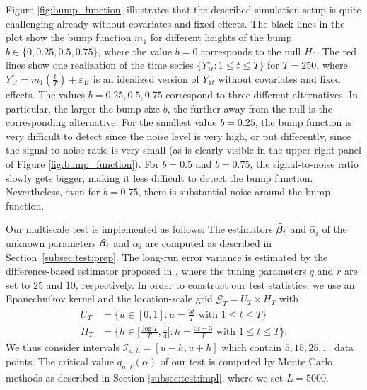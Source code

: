 \documentclass[12pt]{article}
\begin{document}
Figure \ref{fig:bump_function} illustrates that the described simulation setup is quite challenging already without covariates and fixed effects. The black lines in the plot show the bump function $m_1$ for different heights of the bump $b \in \{0, 0.25, 0.5, 0.75\}$, where the value $b=0$ corresponds to the null $H_0$. The red lines show one realization of the time series $\{Y_{1t}^\circ:1 \le t \le T \}$ for $T=250$, where $Y_{1t}^\circ = m_1(\frac{t}{T}) + \varepsilon_{1t}$ is an idealized version of $Y_{1t}$ without covariates and fixed effects. The values $b=0.25,0.5,0.75$ correspond to three different alternatives. In particular, the larger the bump size $b$, the further away from the null is the corresponding alternative. For the smallest value $b=0.25$, the bump function is very difficult to detect since the noise level is very high, or put differently, since the signal-to-noise ratio is very small (as is clearly visible in the upper right panel of Figure \ref{fig:bump_function}). For $b=0.5$ and $b=0.75$, the signal-to-noise ratio slowly gets bigger, making it less difficult to detect the bump function. Nevertheless, even for $b=0.75$, there is substantial noise around the bump function. %


Our multiscale test is implemented as follows: The estimators $\widehat{\bm{\beta}}_i$ and $\widehat{\alpha}_i$ of the unknown parameters $\bm{\beta}_i$ and $\alpha_i$ are computed as described in Section~\ref{subsec:test:prep}.
The long-run error variance is estimated by the difference-based estimator proposed in \cite{KhismatullinaVogt2020}, where the tuning parameters $q$ and $r$ are set to $25$ and $10$, respectively.
In order to construct our test statistics, we use an Epanechnikov kernel and the location-scale grid $\mathcal{G}_T = U_T \times H_T$ with
\begin{align}
U_T & = \big\{ u \in [0,1]: u = \textstyle{\frac{5t}{T}} \text{ with } 1 \le t \le T \big\} \label{eq:grid-loc} \\
H_T & = \big\{ h \in \big[ \textstyle{\frac{\log T}{T}}, \textstyle{\frac{1}{4}} \big]:  h = \textstyle{\frac{5 t -3}{T}} \text{ with } 1 \le t \le T \big\}. \label{eq:grid-scale}
\end{align}
We thus consider intervals $\mathcal{I}_{u, h} = [u-h, u+h]$ which contain $5, 15, 25, \ldots$ data points. The critical value $q_{n,T}(\alpha)$ of our test is computed by Monte Carlo methods as described in Section \ref{subsec:test:impl}, where we set $L=5000$. 
\end{document}
